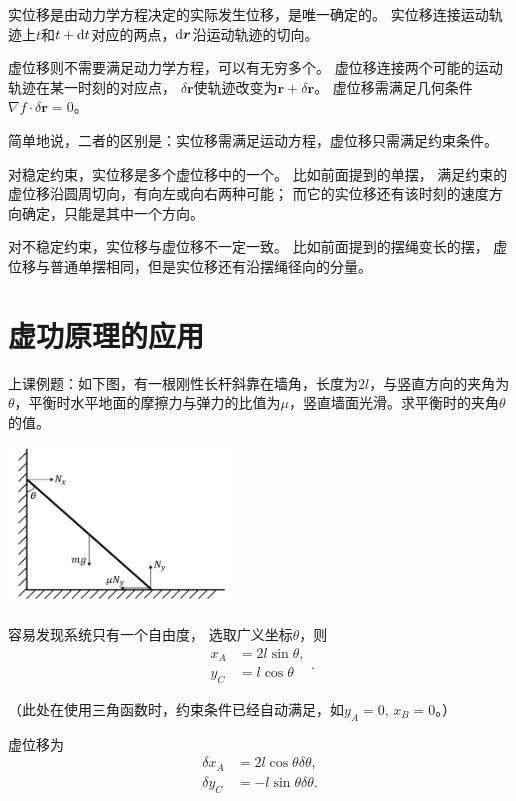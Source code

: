 实位移是由动力学方程决定的实际发生位移，是唯一确定的。
实位移连接运动轨迹上\(t\)和\(t+\mathrm{d} t\)对应的两点，\(\mathrm{d}\boldsymbol{r}\)沿运动轨迹的切向。
\par
虚位移则不需要满足动力学方程，可以有无穷多个。
虚位移连接两个可能的运动轨迹在某一时刻的对应点，
\(\delta \boldsymbol{r}\)使轨迹改变为\(\boldsymbol{r}+\delta\boldsymbol{r}\)。
虚位移需满足几何条件\(\nabla f\cdot\delta\boldsymbol{r}=0\)。
\par
简单地说，二者的区别是：实位移需满足运动方程，虚位移只需满足约束条件。
\par
对稳定约束，实位移是多个虚位移中的一个。
比如前面提到的单摆，
满足约束的虚位移沿圆周切向，有向左或向右两种可能；
而它的实位移还有该时刻的速度方向确定，只能是其中一个方向。
\par
对不稳定约束，实位移与虚位移不一定一致。
比如前面提到的摆绳变长的摆，
虚位移与普通单摆相同，但是实位移还有沿摆绳径向的分量。

\section{虚功原理的应用}

上课例题：如下图，有一根刚性长杆斜靠在墙角，长度为$2l$，与竖直方向的夹角为$\theta$，平衡时水平地面的摩擦力与弹力的比值为$\mu$，竖直墙面光滑。求平衡时的夹角$\theta$的值。

\begin{center}
    \includegraphics[height=120pt]{assets/Virtual_Displacement_Example.png}
\end{center}

容易发现系统只有一个自由度，
选取广义坐标\(\theta\)，则
\[\begin{aligned}
    x_A&=2l\sin\theta,\\
    y_C&=l\cos\theta
\end{aligned}.\]

（此处在使用三角函数时，约束条件已经自动满足，如\(y_A=0,\,x_B=0\)。）

虚位移为
\begin{align*}
    \delta x_A&=2l\cos\theta\delta\theta,\\
    \delta y_C&=-l\sin\theta\delta\theta.
\end{align*}

